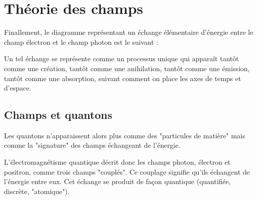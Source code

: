 

\section{Théorie des champs}



Finallement, le diagramme représentant un échange élémentaire d'énergie entre le champ électron et le champ photon est le suivant :

\begin{center}
\end{center}

Un tel échange se représente comme un processus unique qui apparaît tantôt comme une création, tantôt comme une anihilation, tantôt comme une émission, tantôt comme une absorption, suivant comment on place les axes de temps et d'espace.


\subsection{Champs et quantons}

Les quantons n'apparaissent alors plus comme des "particules de matière" mais comme la "signature" des champs échangeant de l'énergie.

L'électromagnétisme quantique décrit donc les champs photon, électron et positron, comme trois champs "couplés". Ce couplage signifie qu'ils échangent de l'énergie entre eux. Cet échange se produit de façon quantique (quantifiée, discrète, "atomique").

